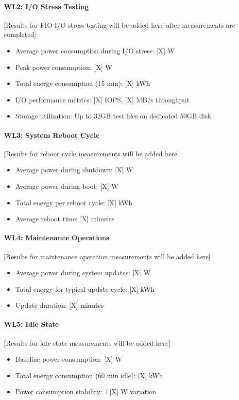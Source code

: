 \paragraph{WL2: I/O Stress Testing}
[Results for FIO I/O stress testing will be added here after measurements are 
completed]

\begin{itemize}
    \item Average power consumption during I/O stress: [X] W
    \item Peak power consumption: [X] W
    \item Total energy consumption (15 min): [X] kWh
    \item I/O performance metrics: [X] IOPS, [X] MB/s throughput
    \item Storage utilization: Up to 32GB test files on dedicated 50GB disk
\end{itemize}

\paragraph{WL3: System Reboot Cycle}
[Results for reboot cycle measurements will be added here]
\begin{itemize}
    \item Average power during shutdown: [X] W
    \item Average power during boot: [X] W
    \item Total energy per reboot cycle: [X] kWh
    \item Average reboot time: [X] minutes
\end{itemize}

\paragraph{WL4: Maintenance Operations}
[Results for maintenance operation measurements will be added here]
\begin{itemize}
    \item Average power during system updates: [X] W
    \item Total energy for typical update cycle: [X] kWh
    \item Update duration: [X] minutes
\end{itemize}

\paragraph{WL5: Idle State}
[Results for idle state measurements will be added here]
\begin{itemize}
    \item Baseline power consumption: [X] W
    \item Total energy consumption (60 min idle): [X] kWh
    \item Power consumption stability: ±[X] W variation
\end{itemize}

